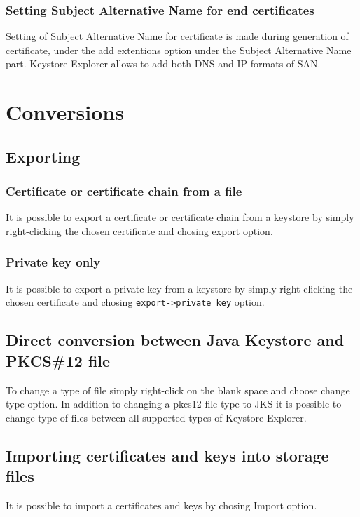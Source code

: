 \documentclass[10pt, a4paper]{report}
\begin{document}
{    \subsubsection{Setting Subject Alternative Name for end certificates}
Setting of Subject Alternative Name for certificate is made during generation of certificate, under the add extentions option under the Subject Alternative Name part. Keystore Explorer allows to add both DNS and IP formats of SAN.

\section{Conversions}

  \subsection{Exporting}
  
    \subsubsection{Certificate or certificate chain from a file}
It is possible to export a certificate or certificate chain from a keystore by simply right-clicking the chosen certificate and chosing export option.

    \subsubsection{Private key only}
It is possible to export a private key from a keystore by simply right-clicking the chosen certificate and chosing \verb+export->private key+ option.

  \subsection{Direct conversion between Java Keystore and PKCS\#12 file}
To change a type of file simply right-click on the blank space and choose change type option. In addition to changing a pkcs12 file type to JKS it is possible to change type of files between all supported types of Keystore Explorer.
  
  \subsection{Importing certificates and keys into storage files}
It is possible to import a certificates and keys by chosing Import option.

}
\end{document}
